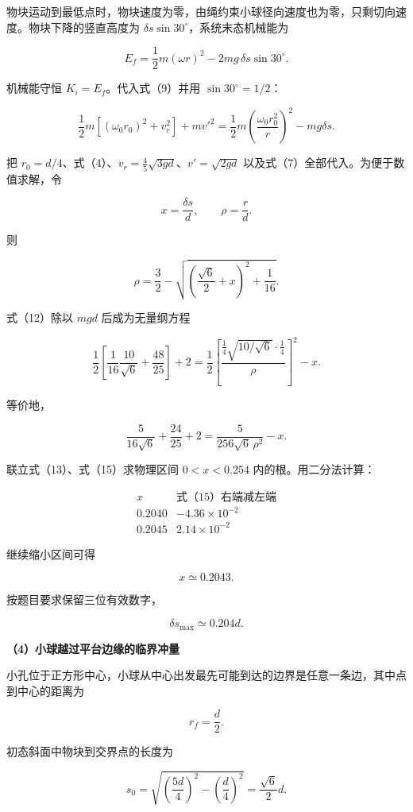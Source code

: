 \documentclass[12pt,a4paper,UTF8]{ctexart}
\begin{document}
物块运动到最低点时，物块速度为零，由绳约束小球径向速度也为零，只剩切向速度。物块下降的竖直高度为
\(\delta s\sin30^\circ\)，系统末态机械能为

\[
E_f
=\frac12m(\omega r)^2
-2mg\,\delta s\sin30^\circ.
\tag{11}
\]

机械能守恒 \(K_i=E_f\)。代入式（9）并用 \(\sin30^\circ=1/2\)：

\[
\frac12m\left[(\omega_0r_0)^2+v_r^2\right]
+mv'^2
=\frac12m\left(\frac{\omega_0r_0^2}{r}\right)^2
-mg\delta s.
\tag{12}
\]

把 \(r_0=d/4\)、式（4）、\(v_r=\frac45\sqrt{3gd}\)、\(v'=\sqrt{2gd}\)
以及式（7）全部代入。为便于数值求解，令

\[
x=\frac{\delta s}{d},
\qquad
\rho=\frac rd.
\]

则

\[
\rho=\frac32-\sqrt{\left(\frac{\sqrt6}{2}+x\right)^2+\frac1{16}}.
\tag{13}
\]

式（12）除以 \(mgd\) 后成为无量纲方程

\[
\frac12\left[
\frac{1}{16}\frac{10}{\sqrt6}
+\frac{48}{25}
\right]+2
=\frac12
\left[
\frac{\frac14\sqrt{10/\sqrt6}\cdot\frac14}{\rho}
\right]^2-x.
\tag{14}
\]

等价地，

\[
\frac{5}{16\sqrt6}+\frac{24}{25}+2
=\frac{5}{256\sqrt6\,\rho^2}-x.
\tag{15}
\]

联立式（13）、式（15）求物理区间 \(0<x<0.254\) 内的根。用二分法计算：

\[
\begin{array}{c|c}
x & \text{式（15）右端减左端}\\ \hline
0.2040 & -4.36\times10^{-2}\\
0.2045 & 2.14\times10^{-2}
\end{array}
\]

继续缩小区间可得

\[
x\simeq0.2043.
\]

按题目要求保留三位有效数字，

\[
\boxed{\delta s_{\max}\simeq0.204d}.
\tag{16}
\]

\textbf{（4）小球越过平台边缘的临界冲量}

小孔位于正方形中心，小球从中心出发最先可能到达的边界是任意一条边，其中点到中心的距离为

\[
r_f=\frac d2.
\tag{17}
\]

初态斜面中物块到交界点的长度为

\[
s_0=\sqrt{\left(\frac{5d}{4}\right)^2-\left(\frac d4\right)^2}
=\frac{\sqrt6}{2}d.
\tag{18}
\]
\end{document}
